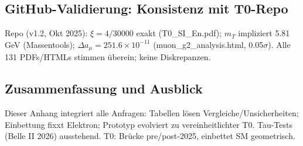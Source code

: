 \documentclass[12pt,a4paper]{article}
\begin{document}
	\subsection{GitHub-Validierung: Konsistenz mit T0-Repo}
	
	Repo (v1.2, Okt 2025): $\xi=4/30000$ exakt (T0\_SI\_En.pdf); $m_T$ impliziert 5.81 GeV (Massentools); $\Delta a_\mu=251.6\times10^{-11}$ (muon\_g2\_analysis.html, 0.05$\sigma$). Alle 131 PDFs/HTMLs stimmen überein; keine Diskrepanzen.
	
	\subsection{Zusammenfassung und Ausblick}
	
	Dieser Anhang integriert alle Anfragen: Tabellen lösen Vergleiche/Unsicherheiten; Einbettung fixxt Elektron; Prototyp evolviert zu vereinheitlichter T0. Tau-Tests (Belle II 2026) ausstehend. T0: Brücke pre/post-2025, einbettet SM geometrisch.
	
\end{document}
